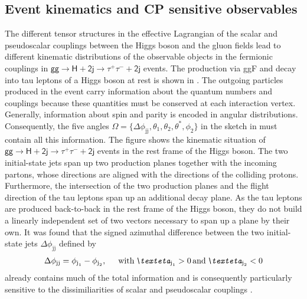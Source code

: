 \clearpage
\subsection{Event kinematics and CP sensitive observables}\label{sec:jdphi}
The different tensor structures in the effective Lagrangian of the scalar and pseudoscalar couplings between the Higgs boson and the gluon fields 
lead to different kinematic distributions of the observable objects in the fermionic couplings in $\mathsf{gg\rightarrow H+2j \rightarrow \tau^+\tau^-+2j}$ events. The production via ggF and decay into tau leptons of a Higgs boson at rest is shown in .
The outgoing particles produced in the event carry information about the quantum numbers and couplings because these quantities must be conserved at each interaction vertex. Generally, information about spin and parity is encoded in angular distributions. 
Consequently, the five angles $\Omega = \{\Delta\phi_\text{jj}, \theta_1, \theta_2, \theta^*,\phi_2 \}$ in the sketch in  must contain all this information. The figure shows the kinematic situation of  $\mathsf{gg\rightarrow H+2j \rightarrow \tau^+\tau^-+2j}$ events in the rest frame of the Higgs boson.
The two initial-state jets span up two production planes together with the incoming partons, whose directions are aligned with the directions of the colliding protons. Furthermore, the intersection of the two production planes and the flight direction of the tau leptons span up an additional decay plane. As the tau leptons are produced back-to-back in the
rest frame of the Higgs boson, they do not build a linearly independent set of two vectors necessary to span up a plane by their own.\newline{}
It was found that the signed azimuthal difference between the two initial-state jets $\Delta\phi_\text{jj}$ defined by 
\begin{equation}
    \Delta\phi_\text{jj} = \phi_{\text{j}_1} - \phi_{\text{j}_2 }, \tab \text{with} \, \eta_{\text{j}_1} > \text{0}\, \text{and} \,  \eta_{\text{j}_2} < \text{0}
\end{equation}
already contains much of the total information and is consequently particularly sensitive to the dissimiliarities of scalar and pseudoscalar couplings \cite{Hankele:2006ma,Plehn:2001nj}.
